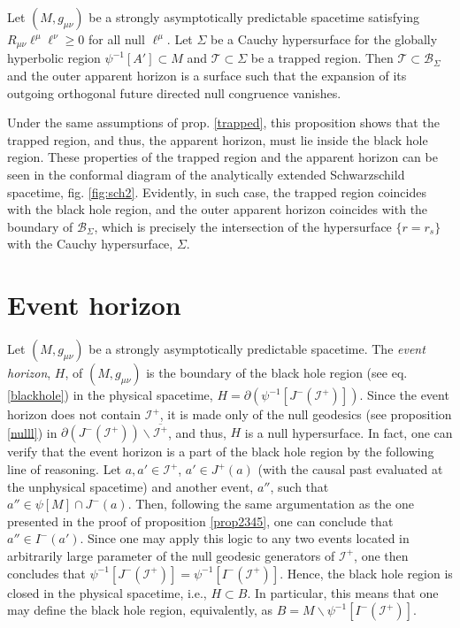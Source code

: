 \documentclass[
12pt,		%
openright,	%
twoside,  %
a4paper,			%
chapter=TITLE,		%
english,			%
french,				%
spanish,			%
brazil				%
]{USPSC-classe/USPSC}
\begin{document}
\begin{proposition}
    Let $(M,g_{\mu\nu})$ be a strongly asymptotically predictable spacetime satisfying $R_{\mu\nu}\ell^{\mu}\ell^{\nu}\geq 0$ for all null $\ell^{\mu}$. Let $\Sigma$ be a Cauchy hypersurface for the globally hyperbolic region $\psi^{-1}[A']\subset M$ and $\mathcal{T}\subset\Sigma$ be a trapped region. Then $\mathcal{T}\subset\mathscr{B}_{\Sigma}$ and the outer apparent horizon is a surface such that the expansion of its outgoing orthogonal future directed null congruence vanishes.
\end{proposition}


Under the same assumptions of prop. \ref{trapped}, this proposition shows that the trapped region, and thus, the apparent horizon, must lie inside the black hole region. These properties of the trapped region and the apparent horizon can be seen in the conformal diagram of the analytically extended Schwarzschild spacetime, fig. \ref{fig:sch2}. Evidently, in such case, the trapped region coincides with the black hole region, and the outer apparent horizon coincides with the boundary of $\mathscr{B}_{\Sigma}$, which is precisely the intersection of the hypersurface $\{r=r_s\}$ with the Cauchy hypersurface, $\Sigma$. 

\section{Event horizon}
Let $(M,g_{\mu\nu})$ be a strongly asymptotically predictable spacetime. The \textit{event horizon}, $H$, of $(M,g_{\mu\nu})$ is the boundary of the black hole region (see eq. \ref{blackhole}) in the physical spacetime, $H=\partial(\psi^{-1}[J^-(\mathscr{I^+})])$. Since the event horizon does not contain $\mathscr{I}^+$, it is made only of the null geodesics (see proposition \ref{nulll}) in $\partial(J^-(\mathscr{I^+}))\backslash{\overline{\mathscr{I}^+}}$, and thus, $H$ is a null hypersurface. In fact, one can verify that the event horizon is a part of the black hole region by the following line of reasoning. Let $a,a'\in\mathscr{I^+}$, $a'\in J^+(a)$ (with the causal past evaluated at the unphysical spacetime) and another event, $a''$, such that $a''\in \psi[M]\cap J^-(a)$. Then, following the same argumentation as the one presented in the proof of proposition \ref{prop2345}, one can conclude that $a''\in I^-(a')$. Since one may apply this logic to any two events located in arbitrarily large parameter of the null geodesic generators of $\mathscr{I^+}$, one then concludes that $\psi^{-1}[J^-(\mathscr{I^+})]=\psi^{-1}[I^-(\mathscr{I^+})]$. Hence, the black hole region is closed in the physical spacetime, i.e., $H\subset B$. In particular, this means that one may define the black hole region, equivalently, as $B=M\backslash \psi^{-1}[I^-(\mathscr{I}^+)]$. 
\end{document}
